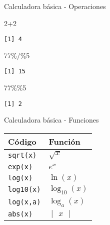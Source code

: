 \documentclass[
  ignorenonframetext,
]{beamer}
\newenvironment{Shaded}{\begin{snugshade}}{\end{snugshade}}
\newcommand{\DecValTok}[1]{\textcolor[rgb]{0.00,0.00,0.81}{#1}}
\newcommand{\SpecialCharTok}[1]{\textcolor[rgb]{0.00,0.00,0.00}{#1}}
\begin{document}
\begin{frame}[fragile]{Calculadora básica - Operaciones}
\protect\hypertarget{calculadora-buxe1sica---operaciones-2}{}
\begin{Shaded}
\begin{Highlighting}[]
\DecValTok{2}\SpecialCharTok{+}\DecValTok{2}
\end{Highlighting}
\end{Shaded}

\begin{verbatim}
[1] 4
\end{verbatim}

\begin{Shaded}
\begin{Highlighting}[]
\DecValTok{77}\SpecialCharTok{\%/\%}\DecValTok{5}
\end{Highlighting}
\end{Shaded}

\begin{verbatim}
[1] 15
\end{verbatim}

\begin{Shaded}
\begin{Highlighting}[]
\DecValTok{77}\SpecialCharTok{\%\%}\DecValTok{5}
\end{Highlighting}
\end{Shaded}

\begin{verbatim}
[1] 2
\end{verbatim}
\end{frame}

\begin{frame}[fragile]{Calculadora básica - Funciones}
\protect\hypertarget{calculadora-buxe1sica---funciones}{}
\begin{longtable}[]{@{}ll@{}}
\toprule
Código & Función \\
\midrule
\endhead
\texttt{sqrt(x)} & \(\sqrt{x}\) \\
\texttt{exp(x)} & \(e^x\) \\
\texttt{log(x)} & \(\ln(x)\) \\
\texttt{log10(x)} & \(\log_{10}(x)\) \\
\texttt{log(x,a)} & \(\log_a(x)\) \\
\texttt{abs(x)} & \(\begin{vmatrix}x\end{vmatrix}\) \\
\bottomrule
\end{longtable}
\end{frame}
\end{document}

